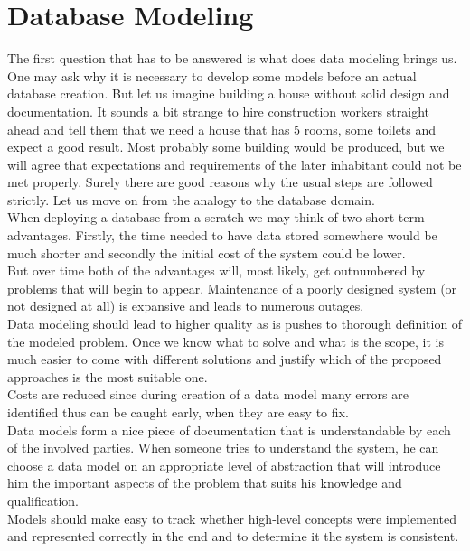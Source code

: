 \chapter{Database Modeling}

The first question that has to be answered is what does data modeling brings us. \\

One may ask why it is necessary to develop some models before an actual database creation.
But let us imagine building a house without solid design and documentation. 
It sounds a bit strange to hire construction workers straight ahead and tell them that we need a house that has 5 rooms, some toilets and expect a good result. Most probably some building would be produced, but we will agree that expectations and requirements of the later inhabitant could not be met properly.
Surely there are good reasons why the usual steps are followed strictly.
Let us move on from the analogy to the database domain. \\
When deploying a database from a scratch we may think of two short term advantages. Firstly, the time needed to have data stored somewhere would be much shorter and secondly the initial cost of the system could be lower. \\
But over time both of the advantages will, most likely, get outnumbered by problems that will begin to appear. Maintenance of a poorly designed system (or not designed at all) is expansive and leads to numerous outages. \\

Data modeling should lead to higher quality as is pushes to thorough definition of the modeled problem. Once we know what to solve and what is the scope, it is much easier to come with different solutions and justify which of the proposed approaches is the most suitable one. \\

Costs are reduced since during creation of a data model many errors are identified thus can be caught early, when they are easy to fix. \\

Data models form a nice piece of documentation that is understandable by each of the involved parties. When someone tries to understand the system, he can choose a data model on an appropriate level of abstraction that will introduce him the important aspects of the problem that suits his knowledge and qualification. \\

Models should make easy to track whether high-level concepts were implemented and represented correctly in the end and to determine it the system is consistent. \\

